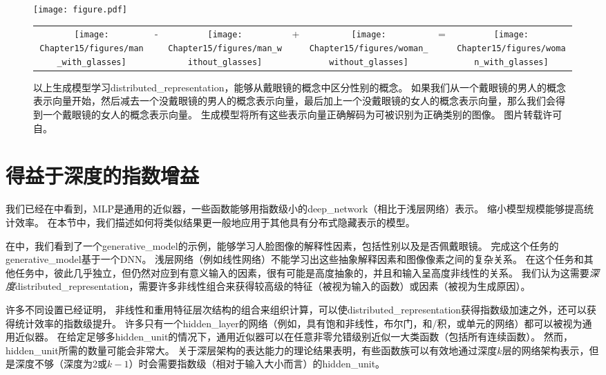 \begin{figure}[!htb]
\ifOpenSource
\centerline{\texttt{[image: figure.pdf]}}
\else
\begin{tabular}{ccccccc}
\texttt{[image: Chapter15/figures/man\_with\_glasses]} &
- &
\texttt{[image: Chapter15/figures/man\_without\_glasses]} &
+ &
\texttt{[image: Chapter15/figures/woman\_without\_glasses]} &
= &
\texttt{[image: Chapter15/figures/woman\_with\_glasses]}
\end{tabular}
\fi
\caption{以上生成模型学习\gls{distributed_representation}，能够从戴眼镜的概念中区分性别的概念。
如果我们从一个戴眼镜的男人的概念表示向量开始，然后减去一个没戴眼镜的男人的概念表示向量，最后加上一个没戴眼镜的女人的概念表示向量，那么我们会得到一个戴眼镜的女人的概念表示向量。
生成模型将所有这些表示向量正确解码为可被识别为正确类别的图像。
图片转载许可自\cite{radford2015unsupervised}。
}
\label{fig:chap15_generative_glasses}
\end{figure}


\section{得益于深度的指数增益}
\label{sec:exponential_gains_from_depth}
我们已经在中看到，\gls{MLP}是通用的近似器，一些函数能够用指数级小的\gls{deep_network}（相比于浅层网络）表示。
缩小模型规模能够提高统计效率。
在本节中，我们描述如何将类似结果更一般地应用于其他具有分布式隐藏表示的模型。


在中，我们看到了一个\gls{generative_model}的示例，能够学习人脸图像的解释性因素，包括性别以及是否佩戴眼镜。
完成这个任务的\gls{generative_model}基于一个\gls{DNN}。
浅层网络（例如线性网络）不能学习出这些抽象解释因素和图像像素之间的复杂关系。
在这个任务和其他任务中，彼此几乎独立，但仍然对应到有意义输入的因素，很有可能是高度抽象的，并且和输入呈高度非线性的关系。
我们认为这需要\emph{深度}\gls{distributed_representation}，需要许多非线性组合来获得较高级的特征（被视为输入的函数）或因素（被视为生成原因）。


许多不同设置已经证明，
非线性和重用特征层次结构的组合来组织计算，可以使\gls{distributed_representation}获得指数级加速之外，还可以获得统计效率的指数级提升。
许多只有一个\gls{hidden_layer}的网络（例如，具有饱和非线性，布尔门，和/积，或单元的网络）都可以被视为通用近似器。
在给定足够多\gls{hidden_unit}的情况下，通用近似器可以在任意非零允错级别近似一大类函数（包括所有连续函数）。
然而，\gls{hidden_unit}所需的数量可能会非常大。
关于深层架构的表达能力的理论结果表明，有些函数族可以有效地通过深度$k$层的网络架构表示，但是深度不够（深度为2或$k-1$）时会需要指数级（相对于输入大小而言）的\gls{hidden_unit}。

